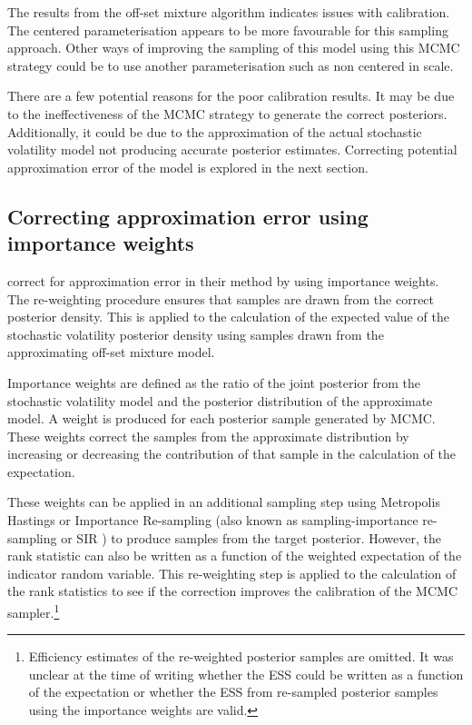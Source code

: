 \documentclass[12pt, a4paper]{article}
\begin{document}
    The results from the off-set mixture algorithm indicates issues with calibration. The centered parameterisation appears to be more favourable for this sampling approach. Other ways of improving the sampling of this model using this MCMC strategy could be to use another parameterisation such as non centered in scale.

    There are a few potential reasons for the poor calibration results. It may be due to the ineffectiveness of the MCMC strategy to generate the correct posteriors. Additionally, it could be due to the approximation of the actual stochastic volatility model not producing accurate posterior estimates. Correcting potential approximation error of the model is explored in the next section.  

    
    \subsection{Correcting approximation error using importance weights}
    \citet{kim1998stochastic} correct for approximation error in their method by using importance weights. The re-weighting procedure ensures that samples are drawn from the correct posterior density. This is applied to the calculation of the expected value of the stochastic volatility posterior density using samples drawn from the approximating off-set mixture model. 

    Importance weights are defined as the ratio of the joint posterior from the stochastic volatility model and the posterior distribution of the approximate model. A weight is produced for each posterior sample generated by MCMC. These weights correct the samples from the approximate distribution by increasing or decreasing the contribution of that sample in the calculation of the expectation. 

    These weights can be applied in an additional sampling step using Metropolis Hastings or Importance Re-sampling (also known as sampling-importance re-sampling or SIR \citep{gelman2013bayesian}) to produce samples from the target posterior. However, the rank statistic can also be written as a function of the weighted expectation of the indicator random variable. This re-weighting step is applied to the calculation of the rank statistics to see if the correction improves the calibration of the MCMC sampler.\footnote{Efficiency estimates of the re-weighted posterior samples are omitted. It was unclear at the time of writing whether the ESS could be written as a function of the expectation or whether the ESS from re-sampled posterior samples using the importance weights are valid.}
\end{document}
